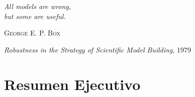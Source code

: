 \documentclass[12pt, letterpaper]{article}
\begin{document}
\newpage


\newpage
\thispagestyle{empty}
\vspace*{\fill}

\begin{center}

{\color{teal!40}\fontsize{70}{70}\selectfont \faQuoteLeft}

\vspace{0.8cm}

\begin{minipage}{0.75\textwidth}
    \centering
    {\fontsize{26}{36}\selectfont\itshape\textcolor{darkteal}{%
    All models are wrong,\\[0.5em]
    but some are useful.}}
\end{minipage}

\vspace{1.5cm}


\vspace{1cm}

{\Large\textsc{\textcolor{burgundy}{George E. P. Box}}}

\vspace{0.4cm}

{\small\textcolor{coolgray}{\textit{Robustness in the Strategy of Scientific Model Building}, 1979}}

\end{center}

\vspace*{\fill}

\newpage
\section{Resumen Ejecutivo}\label{sec:resumen}
\end{document}
